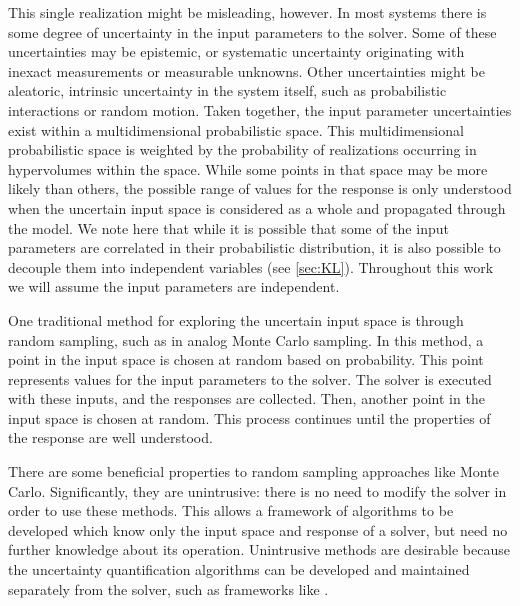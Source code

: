 This single realization might be misleading, however.  In most systems there is some degree of uncertainty in
the input parameters to the solver.  Some of these uncertainties may be epistemic, or systematic uncertainty
originating with inexact measurements or measurable unknowns.  Other uncertainties might be aleatoric,
intrinsic uncertainty in the system itself, such as probabilistic interactions or random motion.  Taken
together, the input parameter uncertainties exist within a multidimensional probabilistic space.  This
multidimensional probabilistic space is weighted by the probability of realizations occurring in hypervolumes
within the space.  While some
points in that space may be more likely than others, the possible range of values for the response is only
understood when the uncertain input space is considered as a whole and propagated through the model.  We note 
here that while it is possible
that some of the input parameters are correlated in their probabilistic distribution, it is also possible to
decouple them into independent variables (see \ref{sec:KL}).  Throughout this work we will assume the input parameters 
are independent.

One traditional method for exploring the uncertain input space is through random sampling, such as in analog Monte
Carlo sampling.  In this method, a point in the input space is chosen at random based on probability.  This
point represents values for the input parameters to the solver.  The solver is executed with these inputs, and
the responses are collected.  Then, another point in the input space is chosen at random.  This process continues
until the properties of the response are well understood.

There are some beneficial properties to random sampling approaches like Monte Carlo.  
Significantly, they are unintrusive:
 there is no need to modify the solver in order to use these methods.  This allows a framework of
algorithms to be developed which know only the input space and response of a solver, but need no further knowledge
about its operation.  Unintrusive methods are desirable because the uncertainty quantification algorithms can
be developed and maintained separately from the solver, such as frameworks like \raven{} \cite{raven}.

